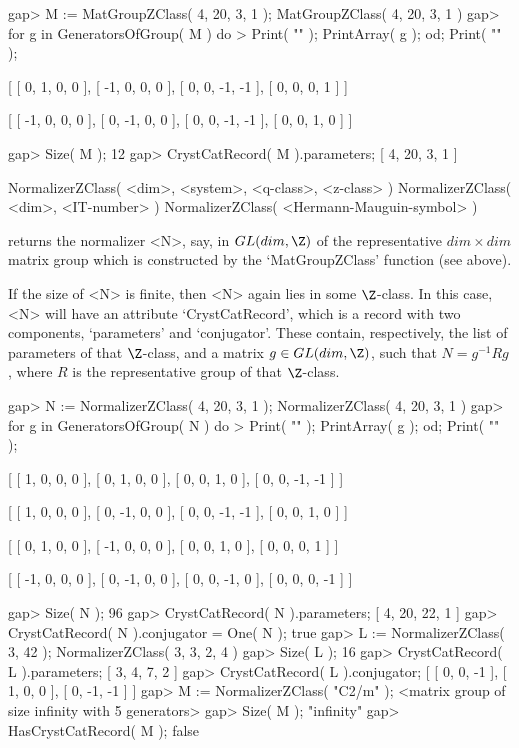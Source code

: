\beginexample
gap> M := MatGroupZClass( 4, 20, 3, 1 );
MatGroupZClass( 4, 20, 3, 1 )
gap> for g in GeneratorsOfGroup( M ) do
>  Print( "\n" ); PrintArray( g ); od; Print( "\n" );

[ [   0,   1,   0,   0 ],
  [  -1,   0,   0,   0 ],
  [   0,   0,  -1,  -1 ],
  [   0,   0,   0,   1 ] ]

[ [  -1,   0,   0,   0 ],
  [   0,  -1,   0,   0 ],
  [   0,   0,  -1,  -1 ],
  [   0,   0,   1,   0 ] ]

gap> Size( M );
12
gap> CrystCatRecord( M ).parameters;
[ 4, 20, 3, 1 ]
\endexample

\>NormalizerZClass( <dim>, <system>, <q-class>, <z-class> )
\>NormalizerZClass( <dim>, <IT-number> )
\>NormalizerZClass( <Hermann-Mauguin-symbol> )

returns the normalizer <N>, say, in $GL(dim,\Z)$ of the representative
$dim \times dim$ matrix group which is constructed by the
`MatGroupZClass' function (see above).

If the size of <N> is finite, then <N> again lies in some $\Z$-class.
In this case, <N> will have an attribute `CrystCatRecord',
which is a record with two components, `parameters' and `conjugator'.
These contain, respectively, the list of parameters of that
$\Z$-class, and a matrix $g \in GL(dim,\Z)$, such that $N = g^{-1} R g$,
where $R$ is the representative group of that $\Z$-class.

\beginexample
gap> N := NormalizerZClass( 4, 20, 3, 1 );
NormalizerZClass( 4, 20, 3, 1 )
gap> for g in GeneratorsOfGroup( N ) do
>  Print( "\n" ); PrintArray( g ); od; Print( "\n" );

[ [   1,   0,   0,   0 ],
  [   0,   1,   0,   0 ],
  [   0,   0,   1,   0 ],
  [   0,   0,  -1,  -1 ] ]

[ [   1,   0,   0,   0 ],
  [   0,  -1,   0,   0 ],
  [   0,   0,  -1,  -1 ],
  [   0,   0,   1,   0 ] ]

[ [   0,   1,   0,   0 ],
  [  -1,   0,   0,   0 ],
  [   0,   0,   1,   0 ],
  [   0,   0,   0,   1 ] ]

[ [  -1,   0,   0,   0 ],
  [   0,  -1,   0,   0 ],
  [   0,   0,  -1,   0 ],
  [   0,   0,   0,  -1 ] ]

gap> Size( N );
96
gap> CrystCatRecord( N ).parameters;
[ 4, 20, 22, 1 ]
gap> CrystCatRecord( N ).conjugator = One( N );
true
gap> L := NormalizerZClass( 3, 42 );
NormalizerZClass( 3, 3, 2, 4 )
gap> Size( L );
16
gap> CrystCatRecord( L ).parameters;
[ 3, 4, 7, 2 ]
gap> CrystCatRecord( L ).conjugator;
[ [ 0, 0, -1 ], [ 1, 0, 0 ], [ 0, -1, -1 ] ]
gap> M := NormalizerZClass( "C2/m" );
<matrix group of size infinity with 5 generators>
gap> Size( M );
"infinity"
gap> HasCrystCatRecord( M );
false
\endexample

